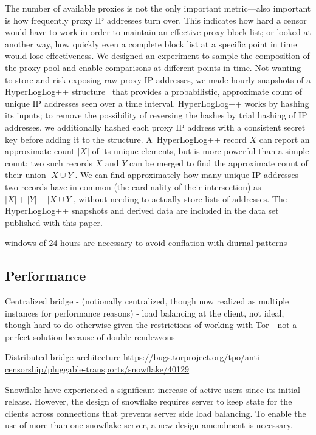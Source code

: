 \documentclass[letterpaper,twocolumn]{article}
\begin{document}
The number of available proxies is not
the only important metric---also important
is how frequently proxy IP addresses turn over.
This indicates how hard a censor would have to work
in order to maintain an effective proxy block list;
or looked at another way,
how quickly even a complete block list
at a specific point in time would lose effectiveness.
We designed an experiment
to sample the composition of the proxy pool
and enable comparisons at different points in time.
Not wanting to store and risk exposing raw proxy IP addresses,
we made hourly snapshots
of a HyperLogLog++ structure~\cite{Heule2013a}
that provides a probabilistic, approximate count
of unique IP addresses seen over a time interval.
HyperLogLog++ works by hashing its inputs;
to remove the possibility of reversing the hashes
by trial hashing of IP addresses,
we additionally hashed each proxy IP address with a consistent secret key
before adding it to the structure.
A~HyperLogLog++ record \(X\)
can report an approximate count \(|X|\)
of its unique elements,
but is more powerful than a simple count:
two such records \(X\) and \(Y\)
can be merged to find the approximate count of their union
\(|X \cup Y|\).
We can find approximately how many
unique IP addresses two records have in common
(the cardinality of their intersection) as
\(|X| + |Y| - |X \cup Y|\),
without needing to actually store lists of addresses.
The HyperLogLog++ snapshots and derived data
are included in the data set
published with this paper.

windows of 24 hours are necessary to avoid
conflation with diurnal patterns

\subsection{Performance}
\label{sec:performance}


Centralized bridge
- (notionally centralized, though now realized as multiple instances for performance reasons)
- load balancing at the client, not ideal, though hard to do otherwise given the restrictions of working with Tor
- not a perfect solution because of double rendezvous

Distributed bridge architecture
\url{https://bugs.torproject.org/tpo/anti-censorship/pluggable-transports/snowflake/40129}

Snowflake have experienced a significant increase of active users since its initial release. However, the design of snowflake requires server to keep state for the clients across connections that prevents server side load balancing. To enable the use of more than one snowflake server, a new design amendment is necessary.
\end{document}
